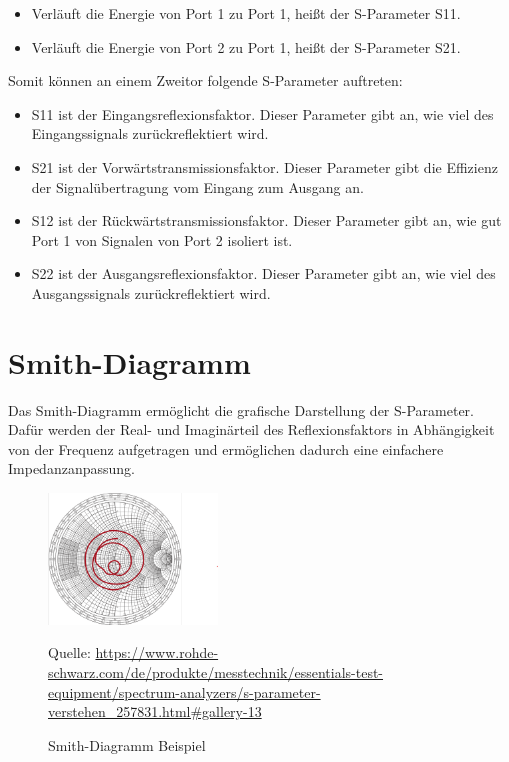 \begin{itemize}
    \item Verläuft die Energie von Port 1 zu Port 1, heißt der S-Parameter S11.
    \item Verläuft die Energie von Port 2 zu Port 1, heißt der S-Parameter S21.
\end{itemize}
Somit können an einem Zweitor folgende S-Parameter auftreten:
\begin{itemize}
    \item S11 ist der Eingangsreflexionsfaktor. Dieser Parameter gibt an, wie viel des Eingangssignals zurückreflektiert wird.
    \item S21 ist der Vorwärtstransmissionsfaktor. Dieser Parameter gibt die Effizienz der Signalübertragung vom Eingang zum Ausgang an.
    \item S12 ist der Rückwärtstransmissionsfaktor. Dieser Parameter gibt an, wie gut Port 1 von Signalen von Port 2 isoliert ist.
    \item S22 ist der Ausgangsreflexionsfaktor. Dieser Parameter gibt an, wie viel des Ausgangssignals zurückreflektiert wird.
\end{itemize}

\section{Smith-Diagramm}
Das Smith-Diagramm ermöglicht die grafische Darstellung der S-Parameter.
Dafür werden der Real- und Imaginärteil des Reflexionsfaktors in Abhängigkeit von der Frequenz
aufgetragen und ermöglichen dadurch eine einfachere Impedanzanpassung.
\begin{figure}[H]
    \centering
    \includegraphics[width=0.4\textwidth]{Pictures/SmithDiagram.png}
    \caption{Smith-Diagramm Beispiel}
    \footnotesize{Quelle: \url{https://www.rohde-schwarz.com/de/produkte/messtechnik/essentials-test-equipment/spectrum-analyzers/s-parameter-verstehen_257831.html#gallery-13}}
\end{figure}

\clearpage